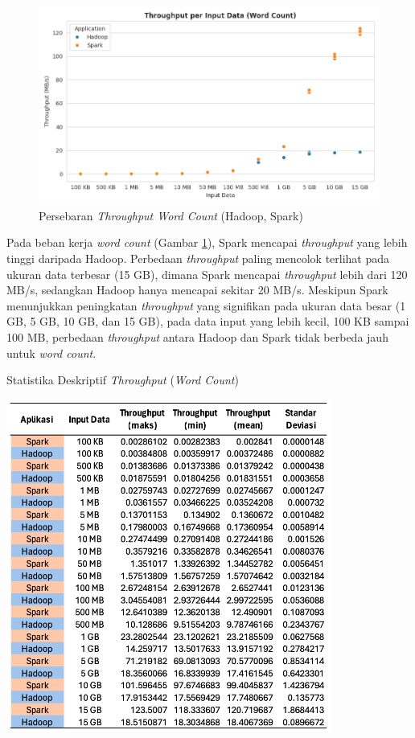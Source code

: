 \begin{figure}[h]
    \centering
    \includegraphics[width=1\textwidth]{figures/ch04/1-throughput-wordcount.png}
    \caption{Persebaran \textit{Throughput Word Count} (Hadoop, Spark)}
    \label{fig:throughput-wordcount}
\end{figure}

Pada beban kerja \textit{word count} (Gambar \ref{fig:throughput-wordcount}), Spark mencapai \textit{throughput} yang lebih tinggi daripada Hadoop. Perbedaan \textit{throughput} paling mencolok terlihat pada ukuran data terbesar (15 GB), dimana Spark mencapai \textit{throughput} lebih dari 120 MB/s, sedangkan Hadoop hanya mencapai sekitar 20 MB/s. Meskipun Spark menunjukkan peningkatan \textit{throughput} yang signifikan pada ukuran data besar (1 GB, 5 GB, 10 GB, dan 15 GB), pada data input yang lebih kecil, 100 KB sampai 100 MB, perbedaan \textit{throughput} antara Hadoop dan Spark tidak berbeda jauh untuk \textit{word count}.

\begin{table}[h]
  \centering
  \caption{Statistika Deskriptif \textit{Throughput} (\textit{Word Count})}
  \includegraphics[width=0.8\textwidth]{figures/ch04/4-wc-th-table}
  \label{table:4-wc-th-table}
\end{table}

